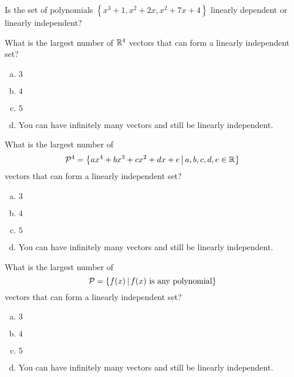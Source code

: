 \begin{activity}{10}
  Is the set of polynomials \(\left\{
  x^3+1,x^2+2x,x^2+7x+4
  \right\}\) linearly dependent or linearly independent?
\end{activity}

\begin{activity}{5}
What is the largest number of \(\mathbb{R}^4\) vectors that can form a linearly independent set?
\begin{enumerate}[(a)]
\item \(3\)
\item \(4\)
\item \(5\)
\item You can have infinitely many vectors and still be linearly independent.
\end{enumerate}
\end{activity}

\begin{activity}{5}
What is the largest number of 
\[\mathcal{P}^4=\left\{ax^4+bx^3+cx^2+dx+e\,\middle|\,a,b,c,d,e\in\mathbb{R}\right\}\]
vectors that can form a linearly independent set?
\begin{enumerate}[(a)]
\item \(3\)
\item \(4\)
\item \(5\)
\item You can have infinitely many vectors and still be linearly independent.
\end{enumerate}
\end{activity}

\begin{activity}{5}
What is the largest number of 
\[\mathcal{P}=\left\{f(x)\,\middle|\,f(x)\text{ is any polynomial}\right\}\]
vectors that can form a linearly independent set?
\begin{enumerate}[(a)]
\item \(3\)
\item \(4\)
\item \(5\)
\item You can have infinitely many vectors and still be linearly independent.
\end{enumerate}
\end{activity}






